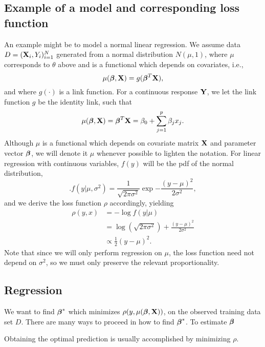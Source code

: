 \subsection{Example of a model and corresponding loss function}
An example might be to model a normal linear regression. We assume data $D=(\mathbf{X}_i,Y_i)_{i=1}^N$ generated from a normal distribution $N(\mu,1)$, where $\mu$ corresponds to $\theta$ above and is a functional which depends on covariates, i.e.,
\begin{equation}
    \mu(\boldsymbol{\beta},\mathbf{X})=g(\boldsymbol{\beta}^T\mathbf{X}),
\end{equation}
and where $g(\cdot)$ is a link function. For a continuous response $\mathbf{Y}$, we let the link function $g$ be the identity link, such that
\begin{equation}
    \mu(\boldsymbol{\beta},\mathbf{X})=\boldsymbol{\beta}^T\mathbf{X}=\beta_0+\sum_{j=1}^p\beta_jx_j.
\end{equation}
Although $\mu$ is a functional which depends on covariate matrix $\mathbf{X}$ and parameter vector $\boldsymbol{\beta}$, we will denote it $\mu$ whenever possible to lighten the notation. For linear regression with continuous variables, $f(y)$ will be the pdf of the normal distribution,
\begin{equation}
    .f(y|\mu,\sigma^2)=\frac{1}{\sqrt{2\pi\sigma^2}}\exp{-\frac{(y-\mu)^2}{2\sigma^2}},
\end{equation}
and we derive the loss function $\rho$ accordingly, yielding
\begin{align*}
    \rho(y,x)&=-\log{f(y|\mu)}\\
    &=\log{(\sqrt{2\pi\sigma^2})}+\frac{(y-\mu)^2}{2\sigma^2} \\
    &\propto\frac{1}{2}\left(y-\mu\right)^2.
\end{align*}
Note that since we will only perform regression on $\mu$, the loss function need not depend on $\sigma^2$, so we must only preserve the relevant proportionality.

\subsection{Regression}
We want to find $\boldsymbol{\beta}^*$ which minimizes $\rho(y,\mu(\boldsymbol{\beta},\mathbf{X}))$, on the observed training data set $D$. There are many ways to proceed in how to find $\boldsymbol{\beta}^*$.
To estimate $\boldsymbol{\beta}$

Obtaining the optimal prediction is usually accomplished by minimizing $\rho$. 

